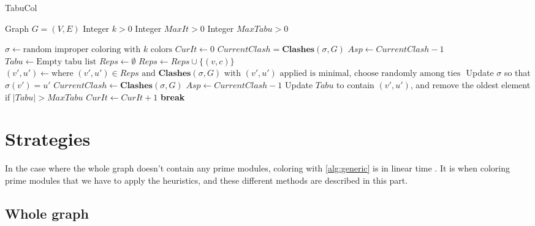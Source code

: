\documentclass{amsart}
\newcommand{\algorithmicbreak}{\textbf{break}}
\newcommand{\BREAK}{\STATE \algorithmicbreak}
\begin{document}
\begin{algorithm}[H]
    \caption{TabuCol}
    \begin{algorithmic}[1]
        \REQUIRE Graph $G = (V,E)$
        \REQUIRE Integer $k > 0$
        \REQUIRE Integer $MaxIt > 0$
        \REQUIRE Integer $MaxTabu > 0$
      
        \STATE $\sigma \leftarrow \text{random improper coloring with $k$ colors}$
        \STATE $CurIt \leftarrow 0$
        \STATE $CurrentClash = \textbf{Clashes}(\sigma,G)$
        \STATE $Asp \leftarrow CurrentClash-1$
        \STATE $Tabu \leftarrow \text{Empty tabu list}$
            \STATE $Reps \leftarrow \emptyset$
                        \STATE $Reps \leftarrow Reps \cup \{(v,c)\}$
                    \ENDIF
                \ENDFOR
            \ENDFOR
            \STATE $(v',u') \leftarrow \text{where $(v',u') \in Reps$ and
            $\textbf{Clashes}(\sigma,G)$ with $(v',u')$ applied is minimal, choose randomly among ties }$
            \STATE Update $\sigma$ so that $\sigma(v') = u'$
            \STATE $CurrentClash \leftarrow \textbf{Clashes}(\sigma,G)$
                \STATE $Asp \leftarrow CurrentClash -1$
            \ENDIF
            \STATE Update $Tabu$ to contain $(v',u')$, and remove the oldest element if $|Tabu| > MaxTabu$
            \STATE $CurIt \leftarrow CurIt + 1$
                \BREAK
            \ENDIF
        \ENDWHILE
    \end{algorithmic}
\end{algorithm}


\section{Strategies}
\label{sec:Strategies}
In the case where the whole graph doesn't contain any prime modules, coloring
with \autoref{alg:generic} is in linear time \cite{MDLinear}. It is when coloring prime modules
that we have to apply the heuristics, and these different methods are
described in this part.

\subsection{Whole graph}
\end{document}
